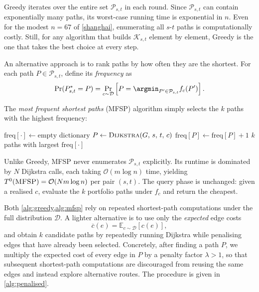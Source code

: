 Greedy iterates over the entire set $\mathcal P_{s,t}$ in each round. Since $\mathcal P_{s,t}$ can contain exponentially many paths, its worst-case running time is exponential in $n$. Even for the modest $n = 67$ of \cref{shanghai}, enumerating all $s$-$t$ paths is computationally costly. Still, for any algorithm that builds $\mathcal K_{s,t}$ element by element, Greedy is the one that takes the best choice at every step.

An alternative approach is to rank paths by how often they are the shortest. For each path $P \in \mathcal P_{s,t}$, define its \emph{frequency} as
\[
\Pr(P^*_{s,t} = P) = \Pr_{c \sim \mathcal D}\left[P = \argmin_{P' \in \mathcal P_{s,t}} f_c(P')\right].
\]

The \emph{most frequent shortest paths} (MFSP) algorithm simply selects the $k$ paths with the highest frequency:

\begin{algorithm}
\caption{Most Frequent Shortest Paths (MFSP) for .}
\label{alg:mfsp}
\begin{algorithmic}[1]
  \State $\text{freq}[\cdot] \gets \text{empty dictionary}$
    \State $P \gets \textsc{Dijkstra}(G,\, s,\, t,\, c)$ 
    \State $\text{freq}[P] \gets \text{freq}[P] + 1$
  \EndFor
  \State \Return $k$ paths with largest $\text{freq}[\cdot]$
\EndProcedure
\end{algorithmic}
\end{algorithm}

Unlike Greedy, MFSP never enumerates $\mathcal P_{s,t}$ explicitly. Its runtime is dominated by $N$ Dijkstra calls, each taking $\mathcal O(m \log n)$ time, yielding $T^0(\textsc{MFSP}) = \mathcal O(N m \log n)$ per pair $(s, t)$. The query phase is unchanged: given a realised $c$, evaluate the $k$ portfolio paths under $f_c$ and return the cheapest.

Both \cref{alg:greedy,alg:mfsp} rely on repeated shortest-path computations under the full distribution $\mathcal D$. A lighter alternative is to use only the \emph{expected} edge costs
\[
\overline c(e) = \mathbb{E}_{c \sim \mathcal D}[c(e)],
\]
and obtain $k$ candidate paths by repeatedly running Dijkstra while penalising edges that have already been selected. Concretely, after finding a path $P$, we multiply the expected cost of every edge in $P$ by a penalty factor $\lambda > 1$, so that subsequent shortest-path computations are discouraged from reusing the same edges and instead explore alternative routes. The procedure is given in \cref{alg:penalised}.

